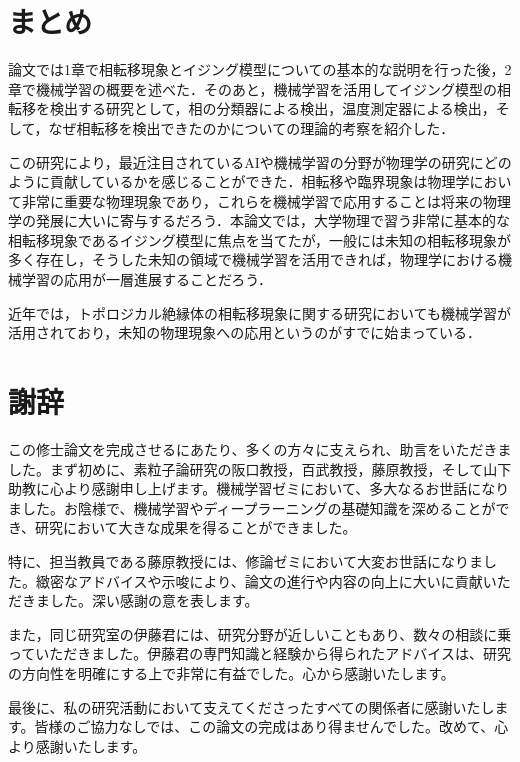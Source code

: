 \documentclass[a4paper,11pt]{jsreport}
\begin{document}


\chapter*{まとめ}
論文では1章で相転移現象とイジング模型についての基本的な説明を行った後，2章で機械学習の概要を述べた．そのあと，機械学習を活用してイジング模型の相転移を検出する研究として，相の分類器による検出，温度測定器による検出，そして，なぜ相転移を検出できたのかについての理論的考察を紹介した．\par
この研究により，最近注目されているAIや機械学習の分野が物理学の研究にどのように貢献しているかを感じることができた．相転移や臨界現象は物理学において非常に重要な物理現象であり，これらを機械学習で応用することは将来の物理学の発展に大いに寄与するだろう．本論文では，大学物理で習う非常に基本的な相転移現象であるイジング模型に焦点を当てたが，一般には未知の相転移現象が多く存在し，そうした未知の領域で機械学習を活用できれば，物理学における機械学習の応用が一層進展することだろう．\par
近年では，トポロジカル絶縁体の相転移現象に関する研究においても機械学習が活用されており，未知の物理現象への応用というのがすでに始まっている．

\chapter*{謝辞} %

この修士論文を完成させるにあたり、多くの方々に支えられ、助言をいただきました。まず初めに、素粒子論研究の阪口教授，百武教授，藤原教授，そして山下助教に心より感謝申し上げます。機械学習ゼミにおいて、多大なるお世話になりました。お陰様で、機械学習やディープラーニングの基礎知識を深めることができ、研究において大きな成果を得ることができました。\par
特に、担当教員である藤原教授には、修論ゼミにおいて大変お世話になりました。緻密なアドバイスや示唆により、論文の進行や内容の向上に大いに貢献いただきました。深い感謝の意を表します。\par
また，同じ研究室の伊藤君には、研究分野が近しいこともあり、数々の相談に乗っていただきました。伊藤君の専門知識と経験から得られたアドバイスは、研究の方向性を明確にする上で非常に有益でした。心から感謝いたします。\par
最後に、私の研究活動において支えてくださったすべての関係者に感謝いたします。皆様のご協力なしでは、この論文の完成はあり得ませんでした。改めて、心より感謝いたします。
\end{document}
